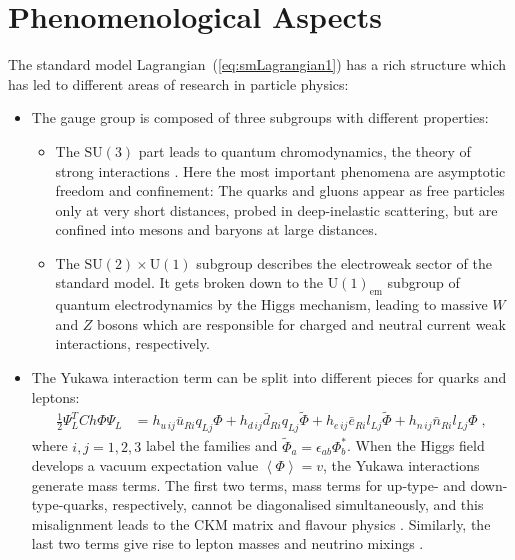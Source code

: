 \documentclass[12pt]{report}
\newcommand{\ls}{{\ensuremath{\scriptscriptstyle L}}}
\newcommand{\rs}{{\ensuremath{\scriptscriptstyle R}}}
\newcommand{\2}{\ensuremath{\sqrt{2}\,}}
\begin{document}
    \section{Phenomenological Aspects}
    The standard model Lagrangian~(\ref{eq:smLagrangian1}) has a rich
    structure which has led to different areas of research in particle physics:
    \begin{itemize}
      \item The gauge group is composed of three subgroups with different properties:
        \begin{itemize}
          \item The $\mathrm{SU(3)}$ part leads to quantum chromodynamics, the theory of strong
            interactions \cite{ecker}. Here the most important phenomena are asymptotic
            freedom and confinement: The quarks and gluons appear as free particles only at very
            short distances, probed in deep-inelastic scattering, but are confined into mesons 
            and baryons at large distances.
          \item The $\mathrm{SU(2) \times U(1)}$ subgroup describes the electroweak sector of the
            standard model. It gets broken down to the $\mathrm U(1)_\text{em}$ subgroup of quantum
            electrodynamics by the Higgs mechanism, leading to massive $W$ and $Z$ bosons which are 
            responsible for charged and neutral current weak interactions, respectively.
      \end{itemize}
      \item The Yukawa interaction term can be split into different pieces for quarks and leptons:
        \begin{align}
          \frac{1}{2} \Psi_L^T C h \Phi \Psi_L &= h_{u \, ij} \bar{u}_{\rs i} q_{\ls j} \Phi + h_{d \, ij}
          \bar{d}_{\rs i} q_{\ls j} \widetilde{\Phi} +h_{e \, ij} \bar{e}_{\rs i} l_{\ls j}
          \widetilde{\Phi} +h_{n \, ij} \bar{n}_{\rs i} l_{\ls j} \Phi\;,
        \end{align}
        where $i,j=1,2,3$ label the families and $\widetilde{\Phi}_a =\epsilon_{ab} \Phi_b^*$. 
        When the Higgs field develops a vacuum expectation
        value $\left<\Phi\right>=v$, the Yukawa interactions generate mass terms. The first two terms,
        mass terms for up-type- and down-type-quarks, respectively, cannot be diagonalised 
        simultaneously,
        and this misalignment leads to the CKM matrix and flavour physics \cite{fleischer}. 
        Similarly, the
        last two terms give rise to lepton masses and neutrino mixings \cite{lindner}.
    \end{itemize}
    
\end{document}
